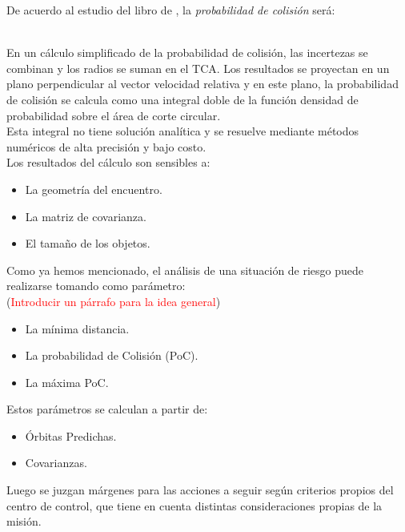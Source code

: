 De acuerdo al estudio del libro de \citep{leichen}, la {\it{probabilidad de colisi\'on}} ser\'a:

\\

En un c\'alculo simplificado de la probabilidad de colisi\'on, las incertezas se combinan y los radios se suman en el TCA. Los resultados se proyectan en un plano perpendicular al vector velocidad relativa y en este plano, la probabilidad de colisi\'on se calcula como una integral doble de la funci\'on densidad de probabilidad sobre el \'area de corte circular.\\
Esta integral no tiene  soluci\'on anal\'itica y se resuelve mediante m\'etodos num\'ericos de alta precisi\'on y bajo costo.\\

Los resultados del c\'alculo son sensibles a:

\begin{itemize}
\itemsep0em
 \item La geometr\'ia del encuentro.
 \item La matriz de covarianza.
 \item El tamaño de los objetos.
\end{itemize}



Como ya hemos mencionado, el an\'alisis de una situaci\'on de riesgo puede realizarse tomando como par\'ametro:\\
(\textcolor{red}{Introducir un p\'arrafo para la idea general})

\begin{itemize}
\itemsep0em
\item La m\'inima distancia.
\item La probabilidad de Colisi\'on (PoC).
\item La m\'axima PoC.
\end{itemize}

Estos par\'ametros se calculan a partir de:
\begin{itemize}
\itemsep0em
\item \'Orbitas Predichas.
\item Covarianzas.
\end{itemize}

Luego se juzgan m\'argenes para las acciones a seguir seg\'un criterios propios del centro de control, que tiene en cuenta distintas consideraciones propias de la misi\'on.\\

